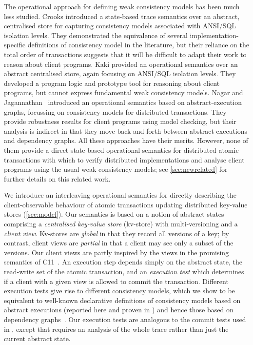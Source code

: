 The operational approach for defining weak consistency models has been
much less studied.  Crooks \etal\citet{seebelieve} introduced
a {state-based} trace semantics over an abstract, centralised store for
capturing consistency models associated with ANSI/SQL isolation
levels. They demonstrated the equivalence of several
implementation-specific definitions of consistency model in the
literature, but their reliance on the total order of transactions
suggests that it will be difficult to adapt their work to reason about
client programs.  Kaki \etal\citet{alonetogether} provided an
operational semantics over an abstract centralised store, again
focusing on ANSI/SQL isolation levels. They developed a program logic
and prototype tool for reasoning about client programs, but cannot
express fundamental weak consistency models. Nagar and Jagannathan~\cite{sureshConcur} introduced an operational semantics based on
abstract-execution graphs, focussing on consistency models for
distributed transactions. They provide robustness results for client
programs using model checking, but their analysis is indirect in that
they move back and forth between abstract executions and dependency
graphs. All these approaches have their merits. However, none of them
provide a direct state-based operational semantics for distributed
atomic transactions with which to verify distributed implementations
and analyse client programs using the usual weak consistency models; 
see \cref{sec:newrelated} for further details on this related work. 



We introduce an interleaving operational semantics for directly describing the
client-observable behaviour of atomic transactions 
updating distributed key-value stores  (\cref{sec:model}). Our semantics is
based on a notion of abstract states comprising a \emph{centralised key-value store} (kv-store) with {multi-versioning} and a \emph{client view}.
Kv-stores are {\em global} in that they record all versions of a key; 
by contrast, client views are {\em partial} in that a client may see only a subset of the versions. 
Our client views are partly inspired by the views in the promising semantics of C11~\cite{promises}. 
An execution step depends simply on the abstract state, the read-write set of the atomic transaction, and an \emph{execution test} which
determines if a client with a given view is allowed to commit the transaction. Different execution tests give rise to different
consistency models, 
which we show to be equivalent to well-known
declarative definitions of consistency models based on abstract executions 
(reported here and proven in \cite{shale-phd}) and hence those based on dependency graphs~\cite{laws}. 
Our execution tests are analogous to the commit tests used in \cite{seebelieve},
except that \cite{seebelieve}  requires an analysis of the whole
trace rather than just the  current abstract state. 

